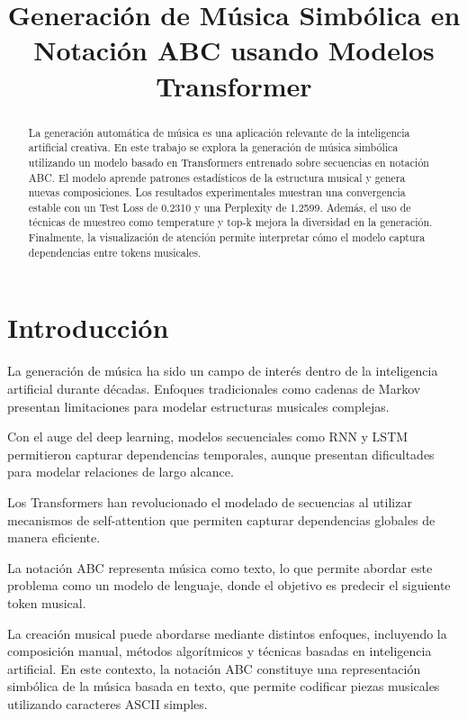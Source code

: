 \documentclass[conference]{IEEEtran}
\title{Generación de Música Simbólica en Notación ABC usando Modelos Transformer}
\author{
\IEEEauthorblockN{José Andrés Naranjo}
\IEEEauthorblockA{Universidad San Francisco de Quito\\
Proyecto de Deep Learning\\
janaranjos@estud.usfq.edu.ec}
}
\begin{document}
\maketitle

\begin{abstract}

La generación automática de música es una aplicación relevante de la inteligencia artificial creativa. En este trabajo se explora la generación de música simbólica utilizando un modelo basado en Transformers entrenado sobre secuencias en notación ABC. El modelo aprende patrones estadísticos de la estructura musical y genera nuevas composiciones. Los resultados experimentales muestran una convergencia estable con un Test Loss de 0.2310 y una Perplexity de 1.2599. Además, el uso de técnicas de muestreo como temperature y top-k mejora la diversidad en la generación. Finalmente, la visualización de atención permite interpretar cómo el modelo captura dependencias entre tokens musicales.

\end{abstract}

\section{Introducción}

La generación de música ha sido un campo de interés dentro de la inteligencia artificial durante décadas. Enfoques tradicionales como cadenas de Markov presentan limitaciones para modelar estructuras musicales complejas.

Con el auge del deep learning, modelos secuenciales como RNN y LSTM permitieron capturar dependencias temporales, aunque presentan dificultades para modelar relaciones de largo alcance.

Los Transformers \cite{vaswani2017attention} han revolucionado el modelado de secuencias al utilizar mecanismos de self-attention que permiten capturar dependencias globales de manera eficiente.

La notación ABC representa música como texto, lo que permite abordar este problema como un modelo de lenguaje, donde el objetivo es predecir el siguiente token musical.

La creación musical puede abordarse mediante distintos enfoques, incluyendo la composición manual, métodos algorítmicos y técnicas basadas en inteligencia artificial. En este contexto, la notación ABC constituye una representación simbólica de la música basada en texto, que permite codificar piezas musicales utilizando caracteres ASCII simples.
\end{document}
